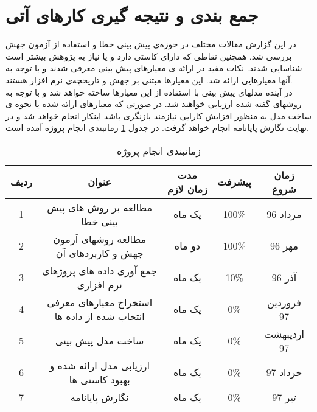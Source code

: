 \section{جمع بندی و نتیجه گیری کارهای آتی}
\label{sec:future}
 در این گزارش مقالات مختلف در حوزه‌ی پیش بینی خطا و استفاده از آزمون جهش بررسی شد. همچنین نقاطی که دارای کاستی دارد و یا نیاز به پژوهش بیشتر است شناسایی شدند. نکات مفید در ارائه ی معیارهای پیش بینی معرفی شدند و با توجه به آنها معیارهایی ارائه شد. این معیارها مبتنی بر جهش و تاریخچه‌ی نرم افزار هستند.\\
 
   در آینده مدلهای پیش بینی با استفاده از این معیارها ساخته خواهد شد و با توجه به روشهای گفته شده ارزیابی خواهند شد. در صورتی که معیارهای ارائه شده یا نحوه ی ساخت مدل به منظور افزایش کارایی نیازمند بازنگری باشد اینکار انجام خواهد شد و در نهایت نگارش پایانامه انجام خواهد گرفت. در جدول \ref{tab:schedule} زمانبندی انجام پروژه آمده است.

\begin{table}[H] 
	\centering \caption{زمانبندی انجام پروژه}
	\label{tab:schedule}

	\begin{tabular}{|c|c|c|c|c|}
		\hline
		\hline
		 ردیف & عنوان & مدت زمان لازم & پیشرفت & زمان شروع
	 \\
		\hline
		\hline
1& مطالعه بر روش های پیش بینی خطا & یک ماه& 100\% & مرداد 96
		\\
		\hline
2 &مطالعه روشهای آزمون جهش و کاربردهای آن &دو ماه &100\%  &مهر 96 
		\\
		\hline
3 & جمع آوری داده های پروژهای نرم افزاری &  یک ماه& 10\% & آذر 96
		\\
		\hline
4 & استخراج معیارهای معرفی انتخاب شده از داده ها &  یک ماه& 0\% & فروردین 97
\\
\hline
5 & ساخت مدل پیش بینی &  یک ماه& 0\% & اردیبهشت 97
\\
\hline
6 & ارزیابی مدل ارائه شده و بهبود کاستی ها &  یک ماه& 0\% & خرداد 97
\\
\hline
7 & نگارش پایانامه &  یک ماه& 0\% & تیر 97\\


\hline
		
	 
	\end{tabular}
\end{table}
